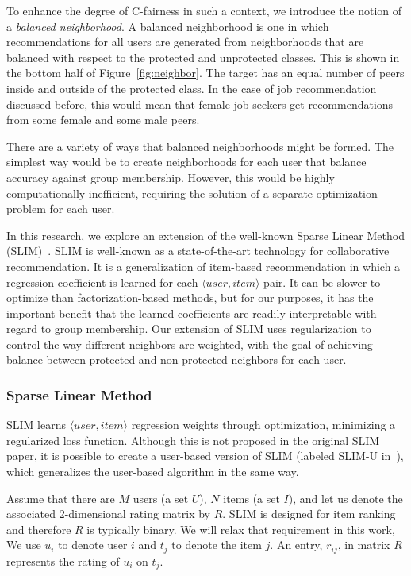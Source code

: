 To enhance the degree of C-fairness in such a context, we introduce the notion of a \textit{balanced neighborhood}. A balanced neighborhood is one in which recommendations for all users are generated from neighborhoods that are balanced with respect to the protected and unprotected classes. This is shown in the bottom half of Figure~\ref{fig:neighbor}. The target has an equal number of peers inside and outside of the protected class. In the case of job recommendation discussed before, this would mean that female job seekers get recommendations from some female and some male peers.

There are a variety of ways that balanced neighborhoods might be formed. The simplest way would be to create neighborhoods for each user that balance accuracy against group membership. However, this would be highly computationally inefficient, requiring the solution of a separate optimization problem for each user. 

In this research, we explore an extension of the well-known Sparse Linear Method (SLIM)~\cite{ning2011slim}. SLIM is well-known as a state-of-the-art technology for collaborative recommendation. It is a generalization of item-based recommendation in which a regression coefficient is learned for each $\langle user, item \rangle$ pair. It can be slower to optimize than factorization-based methods, but for our purposes, it has the important benefit that the learned coefficients are readily interpretable with regard to group membership. Our extension of SLIM uses regularization to control the way different neighbors are weighted, with the goal of achieving balance between protected and non-protected neighbors for each user.

\subsubsection{\textbf{Sparse Linear Method}}
\hfill

SLIM learns $\langle user, item \rangle$ regression weights through optimization, minimizing a regularized loss function. Although this is not proposed in the original SLIM paper, it is possible to create a user-based version of SLIM (labeled SLIM-U in~\cite{zheng2014cslim}), which generalizes the user-based algorithm in the same way. 

Assume that there are $M$ users (a set $U$), $N$ items (a set $I$), and let us denote the associated 2-dimensional rating matrix by $R$. SLIM is designed for item ranking and therefore $R$ is typically binary. We will relax that requirement in this work, We use $u_i$ to denote user $i$ and $t_j$ to denote the item $j$. An entry, $r_{ij}$, in matrix $R$ represents the rating of $u_i$ on $t_j$.


